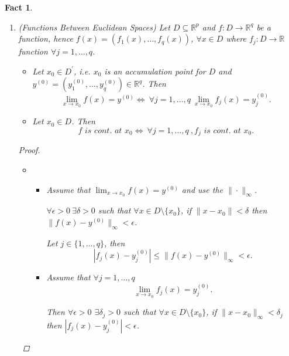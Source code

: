 \documentclass[12pt]{amsbook}
\newtheorem{fact}[theorem]{Fact}
\theoremstyle{definition}
\newcommand{\RR}{{\mathbb R}}
\newcommand{\Ra}{\Rightarrow} %
\newcommand{\La}{\Leftarrow} %
\newcommand{\Lra}{\Leftrightarrow} %
\newcommand{\ra}{\rightarrow} %
\begin{document}
\begin{fact}
\begin{enumerate}
\item (Functions Between Euclidean Spaces) Let $D \subseteq \RR^p$ and $f: D \ra \RR^q$ be a function, hence $f(x) = \left(f_1(x), \ldots, f_q(x)\right)$, $\forall x \in D$ where  $f_j : D \ra \RR$ function $\forall j = 1, \ldots, q$.
    \begin{itemize}
    \item[(i)] Let $x_0 \in D^\prime$, i.e. $x_0$ is an accumulation point for $D$ and \\ $y^{(0)} = \left(y^{(0)}_1, \ldots, y^{(0)}_q\right) \in \RR^q$. Then
    \begin{equation*}
    \lim_{x \ra x_0} f(x) = y^{(0)} \Lra \ \forall j = 1, \ldots, q \  \lim_{x \ra x_0} f_j(x) = y^{(0)}_j.
    \end{equation*}
    \item[(ii)] Let $x_0 \in D$. Then
    \begin{equation*}
    f \textit{ is cont. at } x_0 \Lra \ \forall j = 1, \ldots, q \ , f_j \textit{ is cont. at } x_0.
    \end{equation*}
    \end{itemize}
    
    \begin{proof} \
    \begin{itemize}
    \item[(i)] \
    	\begin{itemize}
	\item["$\Ra$".] Assume that $\lim_{x \ra x_0} f(x) = y^{(0)}$ and use the $\|\cdot\|_\infty$.
	
	$\forall \epsilon > 0 \ \exists \delta > 0$ such that $\forall x \in D \setminus \{x_0\}$, if $\|x - x_0\| < \delta$ then $\|f(x) - y^{(0)}\|_\infty < \epsilon$.
	
	Let $j \in \{1, \ldots, q\}$, then \begin{equation*} |f_j(x) - y^{(0)}_j| \leq \|f(x) - y^{(0)}\|_\infty < \epsilon. \end{equation*}
	
	\item["$\La$".] Assume that $\forall j = 1, \ldots, q$ \begin{equation*} \lim_{x \ra x_0} f_j(x) = y^{(0)}_j. \end{equation*}
	
	Then $\forall \epsilon > 0$ $\exists \delta_j > 0$ such that $\forall x \in D \setminus \{x_0\}$, if $\|x-x_0\|_\infty < \delta_j$ then $|f_j(x) - y^{(0)}_j| < \epsilon$. 
	

\end{itemize}
\end{itemize}
\end{proof}
\end{enumerate}
\end{fact}
\end{document}
